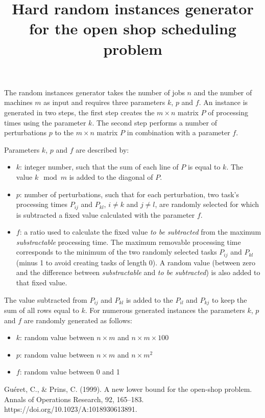 \documentclass[fleqn,10pt]{article}
\title{Hard random instances generator for the open shop scheduling problem}   %
\begin{document}
\flushbottom
\maketitle
\thispagestyle{empty}

The random instances generator takes the number of jobs $n$ and the number of machines $m$ as input and requires three parameters $k$, $p$ and $f$.
An instance is generated in two steps, the first step creates the $ m \times n $ matrix $P$ of processing times using the parameter $k$. The second step performs a number of perturbations $p$ to the $ m \times n $ matrix $P$ in combination with a parameter $f$.

Parameters $k$, $p$ and $f$ are described by:

\begin{itemize}
    \item $k$: integer number, such that the sum of each line of $P$ is equal to $k$. The value $k \mod m$ is added to the diagonal of $P$. 
    \item $p$: number of perturbations, such that for each perturbation, two task's processing times $P_{ij}$ and $ P_{kl}$, $i \neq k $ and $j \neq l$, are randomly selected for which is subtracted a fixed value calculated with the parameter $f$.
    \item $f$: a ratio used to calculate the fixed value \textit{to be subtracted} from the maximum \textit{substractable} processing time. The maximum removable processing time corresponds to the minimum of the two randomly selected tasks $P_{ij}$ and $ P_{kl}$ (minus 1 to avoid creating tasks of length 0). A random value (between zero and the difference between \textit{substractable} and \textit{to be subtracted}) is also added to that fixed value.
\end{itemize}

The value subtracted from $P_{ij}$ and $P_{kl}$ is added to the $P_{il}$ and $P_{kj}$ to keep the sum of all rows equal to $k$.
For numerous generated instances the parameters $k$, $p$ and $f$ are randomly generated as follows:

\begin{itemize}
    \item $k$: random value between $ n \times m$ and $n \times m \times 100 $
    \item $p$: random value between $ n \times m$ and $ n \times m^{2} $
    \item $f$: random value between 0 and 1
\end{itemize}


\begin{thebibliography}{1}
     Guéret, C., \& Prins, C. (1999). A new lower bound for the open-shop problem. Annals of Operations Research, 92, 165–183. https://doi.org/10.1023/A:1018930613891.

\end{thebibliography}
\end{document}
